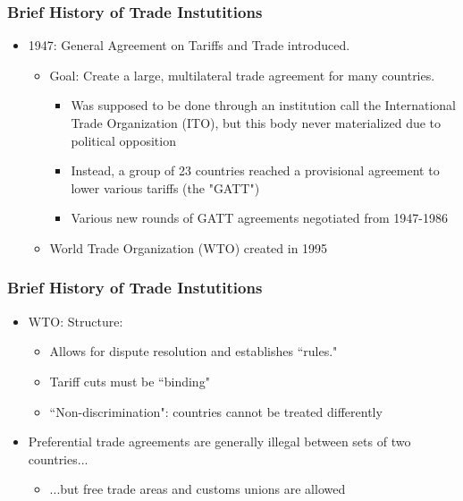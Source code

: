 \documentclass{beamer}
\begin{document}
\begin{frame}
		\frametitle{Brief History of Trade Instutitions}
\begin{itemize}
	\item 1947: General Agreement on Tariffs and Trade introduced.\\
	\begin{itemize}
		\item Goal: Create a large, multilateral trade agreement for many countries.
			\begin{itemize}
				\item Was supposed to be done through an institution call the International Trade Organization (ITO), but this body never materialized due to political opposition
				\item Instead, a group of 23 countries reached a provisional agreement to lower various tariffs (the "GATT")
				\item Various new rounds of GATT agreements negotiated from 1947-1986
			\end{itemize}
		\item World Trade Organization (WTO) created in 1995
	\end{itemize}
\end{itemize}
\end{frame}

\begin{frame}
		\frametitle{Brief History of Trade Instutitions}
\begin{itemize}
	\item WTO: Structure:\\
	\begin{itemize}
		\item Allows for dispute resolution and establishes ``rules."\\
		\item Tariff cuts must be ``binding"\\
		\item ``Non-discrimination": countries cannot be treated differently\\
	\end{itemize}
	\item Preferential trade agreements are generally illegal between sets of two countries...\\
	\begin{itemize}
		\item ...but free trade areas and customs unions are allowed\\
	\end{itemize}
\end{itemize}
\end{frame}
\end{document}
